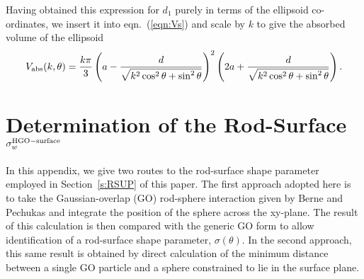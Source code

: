 \documentclass[aps,10pt,twocolumn]{revtex4}
\newcommand{\lp}{\left(}
\newcommand{\rp}{\right)}
\begin{document}
Having obtained this expression for $d_1$ purely in terms of the ellipsoid co-ordinates, we insert it into
eqn.~(\ref{eqn:Vs}) and scale by $k$ to give the absorbed volume of the ellipsoid
\begin{equation}
    V_{\rm abs}(k,\theta) = \frac{k\pi}{3}
    \lp  a - \frac{d}{\sqrt{k^2\cos^2\theta + \sin^2\theta} } \rp^2 
    \lp 2a + \frac{d}{\sqrt{k^2\cos^2\theta + \sin^2\theta} } \rp .
    \label{eqn:finalVe}
\end{equation}



\section{Determination of the Rod-Surface $\sigma^{\rm HGO-surface}_w$ }
\label{app:B} In this appendix, we give two routes to the rod-surface shape parameter employed in
Section~\ref{s:RSUP} of this paper. The first approach adopted here is to take the Gaussian-overlap (GO)
rod-sphere interaction given by Berne and Pechukas \cite{BernePechukas72} and integrate the position of the sphere
across the xy-plane. The result of this calculation is then compared with the generic GO form to allow
identification of a rod-surface shape parameter, $\sigma (\theta)$. In the second approach, this same result is
obtained by direct calculation of the minimum distance between a single GO particle and a sphere constrained to
lie in the surface plane.
\end{document}
